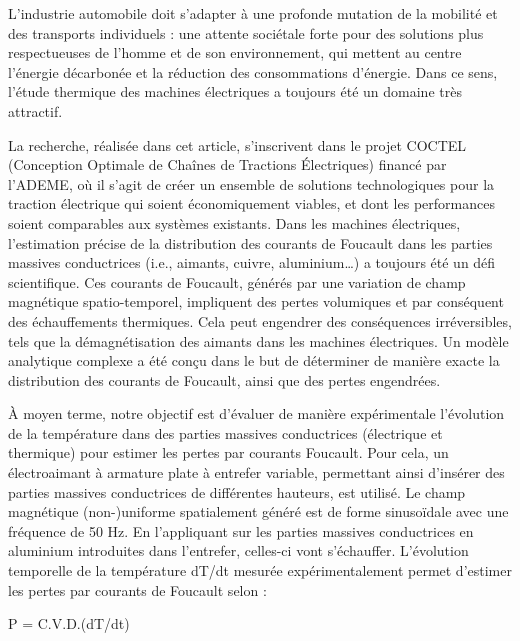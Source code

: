 {\normalsize
L'industrie automobile doit s'adapter à une profonde mutation de la mobilité et des transports individuels : une attente sociétale forte pour des solutions plus respectueuses de l'homme et de son environnement, qui mettent au centre l'énergie décarbonée et la réduction des consommations d'énergie. Dans ce sens, l'étude thermique des machines électriques a toujours été un domaine très attractif.







La recherche, réalisée dans cet article, s'inscrivent dans le projet COCTEL (Conception Optimale de Chaînes de Tractions Électriques) financé par l'ADEME, où il s'agit de créer un ensemble de solutions technologiques pour la traction électrique qui soient économiquement viables, et dont les performances soient comparables aux systèmes existants. Dans les machines électriques, l'estimation précise de la distribution des courants de Foucault dans les parties massives conductrices (i.e., aimants, cuivre, aluminium…) a toujours été un défi scientifique. Ces courants de Foucault, générés par une variation de champ magnétique spatio-temporel, impliquent des pertes volumiques et par conséquent des échauffements thermiques. Cela peut engendrer des conséquences irréversibles, tels que la démagnétisation des aimants dans les machines électriques. Un modèle analytique complexe a été conçu dans le but de déterminer de manière exacte la distribution des courants de Foucault, ainsi que des pertes engendrées.







À moyen terme, notre objectif est d'évaluer de manière expérimentale l'évolution de la température dans des parties massives conductrices (électrique et thermique) pour estimer les pertes par courants Foucault. Pour cela, un électroaimant à armature plate à entrefer variable, permettant ainsi d'insérer des parties massives conductrices de différentes hauteurs, est utilisé. Le champ magnétique (non-)uniforme spatialement généré est de forme sinusoïdale avec une fréquence de 50 Hz. En l'appliquant sur les parties massives conductrices en aluminium introduites dans l'entrefer, celles-ci vont s'échauffer. L'évolution temporelle de la température dT/dt mesurée expérimentalement permet d'estimer les pertes par courants de Foucault selon :



P = C.V.D.(dT/dt)



}
